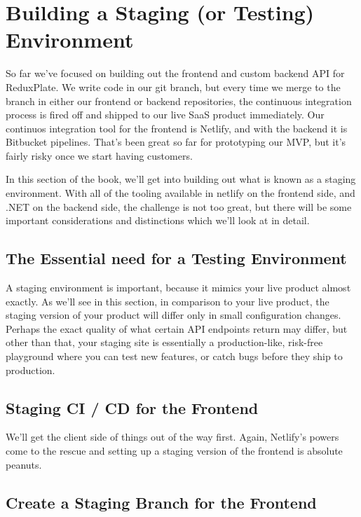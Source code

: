 \documentclass[paper=6in:9in,pagesize=pdftex,headinclude=on,footinclude=on,12pt]{scrbook}
\begin{document}
\chapter{Building a Staging (or Testing) Environment}

So far we've focused on building out the frontend and custom backend API for ReduxPlate. We write code in our  git branch, but every time we merge to the  branch in either our frontend or backend repositories, the continuous integration process is fired off and shipped to our live SaaS product immediately. Our continuos integration tool for the frontend is Netlify, and with the backend it is Bitbucket pipelines. That's been great so far for prototyping our MVP, but it's fairly risky once we start having customers.

In this section of the book, we'll get into building out what is known as a staging environment. With all of the tooling available in netlify on the frontend side, and .NET on the backend side, the challenge is not too great, but there will be some important considerations and distinctions which we'll look at in detail.

\section{The Essential need for a Testing Environment}

A staging environment is important, because it mimics your live product almost exactly. As we'll see in this section, in comparison to your live product, the staging version of your product will differ only in small configuration changes. Perhaps the exact quality of what certain API endpoints return may differ, but other than that, your staging site is essentially a production-like, risk-free playground where you can test new features, or catch bugs before they ship to production.

\section{Staging CI / CD for the Frontend}

We'll get the client side of things out of the way first. Again, Netlify's powers come to the rescue and setting up a staging version of the frontend is absolute peanuts. 

\section{Create a Staging Branch for the Frontend}
\end{document}
